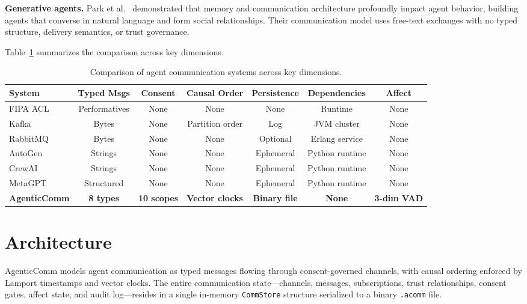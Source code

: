 \documentclass[10pt, twocolumn]{article}
\begin{document}
\textbf{Generative agents.} Park et al.~\cite{park2023generative} demonstrated that memory and communication architecture profoundly impact agent behavior, building agents that converse in natural language and form social relationships. Their communication model uses free-text exchanges with no typed structure, delivery semantics, or trust governance.

Table~\ref{tab:related} summarizes the comparison across key dimensions.

\begin{table}[t]
\caption{Comparison of agent communication systems across key dimensions.}
\label{tab:related}
\centering
\small
\begin{tabular}{@{}lcccccc@{}}
\toprule
\textbf{System} & \textbf{Typed Msgs} & \textbf{Consent} & \textbf{Causal Order} & \textbf{Persistence} & \textbf{Dependencies} & \textbf{Affect} \\
\midrule
FIPA ACL~\cite{fipa2002} & Performatives & None & None & None & Runtime & None \\
Kafka~\cite{kafka2011} & Bytes & None & Partition order & Log & JVM cluster & None \\
RabbitMQ~\cite{rabbitmq2012} & Bytes & None & None & Optional & Erlang service & None \\
AutoGen~\cite{autogen2023} & Strings & None & None & Ephemeral & Python runtime & None \\
CrewAI~\cite{crewai2024} & Strings & None & None & Ephemeral & Python runtime & None \\
MetaGPT~\cite{hong2023metagpt} & Structured & None & None & Ephemeral & Python runtime & None \\
\midrule
\textbf{AgenticComm} & \textbf{8 types} & \textbf{10 scopes} & \textbf{Vector clocks} & \textbf{Binary file} & \textbf{None} & \textbf{3-dim VAD} \\
\bottomrule
\end{tabular}
\end{table}


\section{Architecture}
\label{sec:architecture}

AgenticComm models agent communication as typed messages flowing through consent-governed channels, with causal ordering enforced by Lamport timestamps and vector clocks. The entire communication state---channels, messages, subscriptions, trust relationships, consent gates, affect state, and audit log---resides in a single in-memory \texttt{CommStore} structure serialized to a binary \texttt{.acomm} file.
\end{document}
